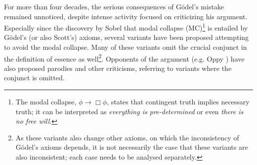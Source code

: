 \documentclass{article}
\begin{document}
For more than four decades, the serious consequences of G\"odel's
mistake remained unnoticed, despite intense activity focused on
criticizing his argument. Especially since the discovery by Sobel
\cite{Sobel} that modal collapse (MC)\footnote{The modal collapse,
  $\phi\rightarrow \Box \phi$, states that contingent truth implies
  necessary truth; it can be interpreted as \textit{everything is
    pre-determined} or even \textit{there is no free will}. } is
entailed by G\"odel's (or also Scott's) axioms, several variants have
been proposed
\cite{Anderson,AndersonGettings,Hajek1,Hajek2,Hajek3,Bjordal}
attempting to avoid the modal collapse. Many of these variants omit
the crucial conjunct in the definition of essence as well\footnote{As
  these variants also change other axioms, on which the inconsistency
  of G\"odel's axioms depends, it is not necessarily the case that
  these variants are also inconsistent; each case needs to be analysed
  separately.}. Opponents of the argument
(e.g. Oppy \cite[p.226/227]{oppy96:_goedel_ontol_argum}
\cite[p.364]{oppy00:_respon_gettin}
\cite[p.1068]{oppy08:_higher_order_ontol_argum}) have also proposed
parodies and other criticisms, referring to variants where the
conjunct is omitted.






\end{document}
